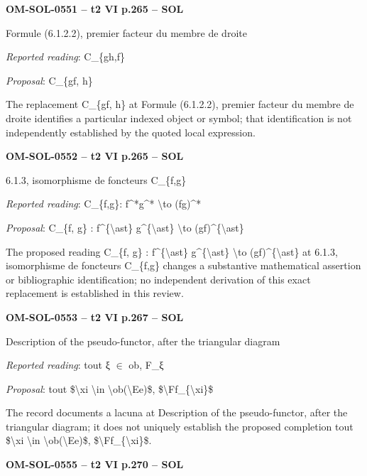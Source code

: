 \par\noindent\textbf{OM-SOL-0551 -- t2 VI p.265 -- SOL}\par
Formule (6.1.2.2), premier facteur du membre de droite\par
\emph{Reported reading}: C\_\{gh,f\}\par
\emph{Proposal}: C\_\{gf, h\}\par
The replacement C\_\{gf, h\} at Formule (6.1.2.2), premier facteur du membre de droite identifies a particular indexed object or symbol; that identification is not independently established by the quoted local expression.\par
\par\noindent\textbf{OM-SOL-0552 -- t2 VI p.265 -- SOL}\par
6.1.3, isomorphisme de foncteurs C\_\{f,g\}\par
\emph{Reported reading}: C\_\{f,g\}: f\textasciicircum{}*g\textasciicircum{}* \textbackslash{}to (fg)\textasciicircum{}*\par
\emph{Proposal}: C\_\{f, g\} : f\textasciicircum{}\{\textbackslash{}ast\} g\textasciicircum{}\{\textbackslash{}ast\} \textbackslash{}to (gf)\textasciicircum{}\{\textbackslash{}ast\}\par
The proposed reading C\_\{f, g\} : f\textasciicircum{}\{\textbackslash{}ast\} g\textasciicircum{}\{\textbackslash{}ast\} \textbackslash{}to (gf)\textasciicircum{}\{\textbackslash{}ast\} at 6.1.3, isomorphisme de foncteurs C\_\{f,g\} changes a substantive mathematical assertion or bibliographic identification; no independent derivation of this exact replacement is established in this review.\par
\par\noindent\textbf{OM-SOL-0553 -- t2 VI p.267 -- SOL}\par
Description of the pseudo-functor, after the triangular diagram\par
\emph{Reported reading}: tout ξ \ensuremath{\in} ob, F\_ξ\par
\emph{Proposal}: tout \$\textbackslash{}xi \textbackslash{}in \textbackslash{}ob(\textbackslash{}Ee)\$, \$\textbackslash{}Ff\_\{\textbackslash{}xi\}\$\par
The record documents a lacuna at Description of the pseudo-functor, after the triangular diagram; it does not uniquely establish the proposed completion tout \$\textbackslash{}xi \textbackslash{}in \textbackslash{}ob(\textbackslash{}Ee)\$, \$\textbackslash{}Ff\_\{\textbackslash{}xi\}\$.\par
\par\noindent\textbf{OM-SOL-0555 -- t2 VI p.270 -- SOL}\par
